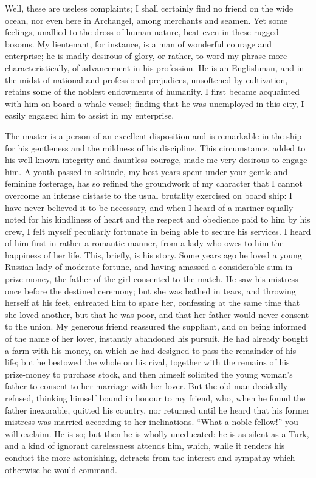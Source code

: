 \documentclass[12pt,openright]{book}
\begin{document}
Well, these are useless complaints; I shall certainly find no friend on the wide ocean, nor even here in Archangel, among merchants and seamen. Yet some feelings, unallied to the dross of human nature, beat even in these rugged bosoms. My lieutenant, for instance, is a man of wonderful courage and enterprise; he is madly desirous of glory, or rather, to word my phrase more characteristically, of advancement in his profession. He is an Englishman, and in the midst of national and professional prejudices, unsoftened by cultivation, retains some of the noblest endowments of humanity. I first became acquainted with him on board a whale vessel; finding that he was unemployed in this city, I easily engaged him to assist in my enterprise.

The master is a person of an excellent disposition and is remarkable in the ship for his gentleness and the mildness of his discipline. This circumstance, added to his well-known integrity and dauntless courage, made me very desirous to engage him. A youth passed in solitude, my best years spent under your gentle and feminine fosterage, has so refined the groundwork of my character that I cannot overcome an intense distaste to the usual brutality exercised on board ship: I have never believed it to be necessary, and when I heard of a mariner equally noted for his kindliness of heart and the respect and obedience paid to him by his crew, I felt myself peculiarly fortunate in being able to secure his services. I heard of him first in rather a romantic manner, from a lady who owes to him the happiness of her life. This, briefly, is his story. Some years ago he loved a young Russian lady of moderate fortune, and having amassed a considerable sum in prize-money, the father of the girl consented to the match. He saw his mistress once before the destined ceremony; but she was bathed in tears, and throwing herself at his feet, entreated him to spare her, confessing at the same time that she loved another, but that he was poor, and that her father would never consent to the union. My generous friend reassured the suppliant, and on being informed of the name of her lover, instantly abandoned his pursuit. He had already bought a farm with his money, on which he had designed to pass the remainder of his life; but he bestowed the whole on his rival, together with the remains of his prize-money to purchase stock, and then himself solicited the young woman’s father to consent to her marriage with her lover. But the old man decidedly refused, thinking himself bound in honour to my friend, who, when he found the father inexorable, quitted his country, nor returned until he heard that his former mistress was married according to her inclinations. “What a noble fellow!” you will exclaim. He is so; but then he is wholly uneducated: he is as silent as a Turk, and a kind of ignorant carelessness attends him, which, while it renders his conduct the more astonishing, detracts from the interest and sympathy which otherwise he would command.
\end{document}
